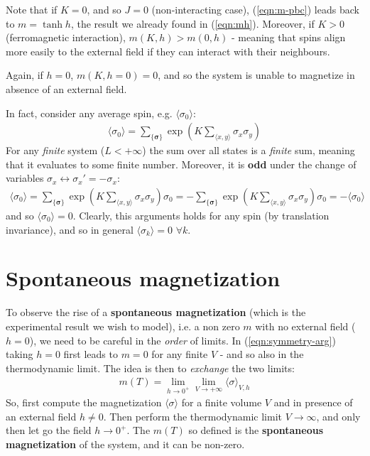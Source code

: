 \documentclass[../../main.tex]{subfiles}
\begin{document}
\medskip

Note that if $K = 0$, and so $J=0$ (non-interacting case), (\ref{eqn:m-pbc}) leads back to $m = \tanh h$, the result we already found in (\ref{eqn:mh}). Moreover, if $K > 0$ (ferromagnetic interaction), $m(K,h) > m(0,h)$ - meaning that spins align more easily to the external field if they can interact with their neighbours.

\medskip

Again, if $h=0$, $m(K,h=0) = 0$, and so the system is unable to magnetize in absence of an external field.

In fact, consider any average spin, e.g. $\langle \sigma_0 \rangle$:
\begin{align*}
    \langle \sigma_0 \rangle = \sum_{\{\bm{\sigma}\}} \exp\left(K \sum_{\langle x,y \rangle} \sigma_x \sigma_y\right)
\end{align*}
For any \textit{finite} system ($L < +\infty$) the sum over all states is a \textit{finite} sum, meaning that it evaluates to some finite number. Moreover, it is \textbf{odd} under the change of variables $\sigma_x \leftrightarrow \sigma_x' = -\sigma_x$:
\begin{align}\label{eqn:symmetry-arg}
    \langle \sigma_0 \rangle = \sum_{\{\bm{\sigma}\}} \exp\left(K \sum_{\langle x,y \rangle} \sigma_x \sigma_y\right)  \sigma_0 = -\sum_{\{\bm{\sigma}\}} \exp\left(K \sum_{\langle x,y \rangle} \sigma_x \sigma_y \right) \sigma_0 = -\langle \sigma_0 \rangle
\end{align} 
and so $\langle \sigma_0 \rangle = 0$. Clearly, this arguments holds for any spin (by translation invariance), and so in general $\langle \sigma_k \rangle = 0$ $\forall k$.

\section{Spontaneous magnetization}
To observe the rise of a \textbf{spontaneous magnetization} (which is the experimental result we wish to model), i.e. a non zero $m$ with no external field ($h=0$), we need to be careful in the \textit{order} of limits. In (\ref{eqn:symmetry-arg}) taking $h = 0$ first leads to $m = 0$ for any finite $V$ - and so also in the thermodynamic limit. The idea is then to \textit{exchange} the two limits:
\begin{align}\label{eqn:break1}
    m(T) = \lim_{h \to 0^+} \lim_{V \to+ \infty} \langle \sigma \rangle_{V,h}
\end{align}
So, first compute the magnetization $\langle \sigma \rangle$ for a finite volume $V$ and in presence of an external field $h \neq 0$. Then perform the thermodynamic limit $V \to \infty$, and only then let go the field $h \to 0^+$. The $m(T)$ so defined is the \textbf{spontaneous magnetization} of the system, and it can be non-zero.
\end{document}

